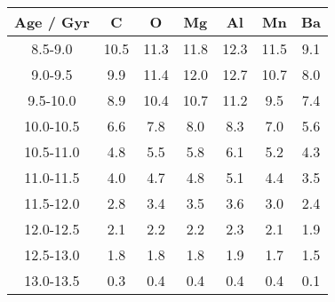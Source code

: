 \begin{tabular}{ccccccc}
\hline\hline
Age / Gyr & C & O & Mg & Al & Mn & Ba \\
\hline
8.5-9.0 & 10.5 & 11.3 & 11.8 & 12.3 & 11.5 & 9.1\\
9.0-9.5 & 9.9 & 11.4 & 12.0 & 12.7 & 10.7 & 8.0\\
9.5-10.0 & 8.9 & 10.4 & 10.7 & 11.2 & 9.5 & 7.4\\
10.0-10.5 & 6.6 & 7.8 & 8.0 & 8.3 & 7.0 & 5.6\\
10.5-11.0 & 4.8 & 5.5 & 5.8 & 6.1 & 5.2 & 4.3\\
11.0-11.5 & 4.0 & 4.7 & 4.8 & 5.1 & 4.4 & 3.5\\
11.5-12.0 & 2.8 & 3.4 & 3.5 & 3.6 & 3.0 & 2.4\\
12.0-12.5 & 2.1 & 2.2 & 2.2 & 2.3 & 2.1 & 1.9\\
12.5-13.0 & 1.8 & 1.8 & 1.8 & 1.9 & 1.7 & 1.5\\
13.0-13.5 & 0.3 & 0.4 & 0.4 & 0.4 & 0.4 & 0.1\\
\hline
\end{tabular}
